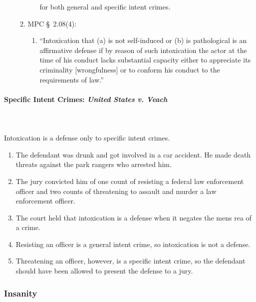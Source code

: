 \begin{enumerate}
\begin{enumerate}
\begin{enumerate}
            for both general and specific intent crimes.
        \end{enumerate}
        \item MPC \S\ 2.08(4):
        \begin{enumerate}
            \item ``Intoxication that (a) is not self-induced or (b) is 
            pathological is an affirmative defense if by reason of such 
            intoxication the actor at the time of his conduct lacks 
            substantial capacity either to appreciate its criminality 
            [wrongfulness] or to conform his conduct to the requirements of 
            law.''
        \end{enumerate}
    \end{enumerate}
\end{enumerate}

\paragraph{Specific Intent Crimes: \emph{United States v. Veach}}
~\\\\
Intoxication is a defense only to specific intent crimes.

\begin{enumerate}
    \item The defendant was drunk and got involved in a car accident. He made 
    death threats against the park rangers who arrested him.
    \item The jury convicted him of one count of resisting a federal law 
    enforcement officer and two counts of threatening to assault and murder a 
    law enforcement officer.
    \item The court held that intoxication is a defense when it negates the 
    mens rea of a crime.
    \item Resisting an officer is a general intent crime, so intoxication is 
    not a defense.
    \item Threatening an officer, however, is a specific intent crime, so the 
    defendant should have been allowed to present the defense to a jury.
\end{enumerate}

\subsubsection{Insanity}

